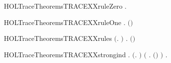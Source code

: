 \newcommand{\HOLTraceTheoremsTRACEXXREFL}{\UseVerbatim{HOLTraceTheoremsTRACEXXREFL}}
\begin{SaveVerbatim}{HOLTraceTheoremsTRACEXXruleZero}
\HOLTokenTurnstile{} \HOLSymConst{\HOLTokenForall{}}.   \HOLConst{\ensuremath{\epsilon}} 
\end{SaveVerbatim}
\newcommand{\HOLTraceTheoremsTRACEXXruleZero}{\UseVerbatim{HOLTraceTheoremsTRACEXXruleZero}}
\begin{SaveVerbatim}{HOLTraceTheoremsTRACEXXruleOne}
\HOLTokenTurnstile{} \HOLSymConst{\HOLTokenForall{}}    .  \HOLTokenTransBegin{}\HOLTokenTransEnd {} \HOLSymConst{\HOLTokenConj{}}     \HOLSymConst{\HOLTokenImp{}}   \ensuremath{(}\HOLSymConst{::}\ensuremath{)} 
\end{SaveVerbatim}
\newcommand{\HOLTraceTheoremsTRACEXXruleOne}{\UseVerbatim{HOLTraceTheoremsTRACEXXruleOne}}
\begin{SaveVerbatim}{HOLTraceTheoremsTRACEXXrules}
\HOLTokenTurnstile{} \ensuremath{(}\HOLSymConst{\HOLTokenForall{}}.   \HOLConst{\ensuremath{\epsilon}} \ensuremath{)} \HOLSymConst{\HOLTokenConj{}}
   \HOLSymConst{\HOLTokenForall{}}    .  \HOLTokenTransBegin{}\HOLTokenTransEnd {} \HOLSymConst{\HOLTokenConj{}}     \HOLSymConst{\HOLTokenImp{}}   \ensuremath{(}\HOLSymConst{::}\ensuremath{)} 
\end{SaveVerbatim}
\newcommand{\HOLTraceTheoremsTRACEXXrules}{\UseVerbatim{HOLTraceTheoremsTRACEXXrules}}
\begin{SaveVerbatim}{HOLTraceTheoremsTRACEXXstrongind}
\HOLTokenTurnstile{} \HOLSymConst{\HOLTokenForall{}}.
       \ensuremath{(}\HOLSymConst{\HOLTokenForall{}}.   \HOLConst{\ensuremath{\epsilon}} \ensuremath{)} \HOLSymConst{\HOLTokenConj{}}
       \ensuremath{(}\HOLSymConst{\HOLTokenForall{}}    .
             \HOLTokenTransBegin{}\HOLTokenTransEnd {} \HOLSymConst{\HOLTokenConj{}}     \HOLSymConst{\HOLTokenConj{}}     \HOLSymConst{\HOLTokenImp{}}   \ensuremath{(}\HOLSymConst{::}\ensuremath{)} \ensuremath{)} \HOLSymConst{\HOLTokenImp{}}
       \HOLSymConst{\HOLTokenForall{}}  .     \HOLSymConst{\HOLTokenImp{}}    
\end{SaveVerbatim}
